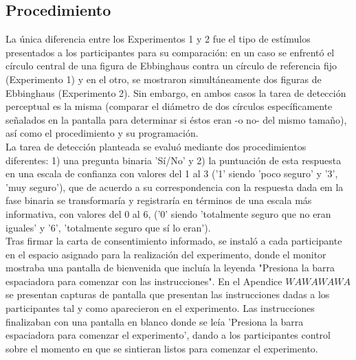 \begin{itemize}
\section{Procedimiento}

La única diferencia entre los Experimentos 1 y 2 fue el tipo de estímulos presentados a los participantes para su comparación: en un caso se enfrentó el círculo central de una figura de Ebbinghaus contra un círculo de referencia fijo (Experimento 1) y en el otro, se mostraron simultáneamente dos figuras de Ebbinghaus (Experimento 2). Sin embargo, en ambos casos la tarea de detección perceptual es la misma (comparar el diámetro de dos círculos específicamente señalados en la pantalla para determinar si éstos eran -o no- del mismo tamaño), así como el procedimiento y su programación.\\

La tarea de detección planteada se evaluó mediante dos procedimientos diferentes: 1) una pregunta binaria 'Sí/No' y 2) la puntuación de esta respuesta en una escala de confianza con valores del 1 al 3 ('1' siendo 'poco seguro' y '3', 'muy seguro'), que de acuerdo a su correspondencia con la respuesta dada em la fase binaria se transformaría y registraría en términos de una escala más informativa, con valores del 0 al 6, ('0' siendo 'totalmente seguro que no eran iguales' y '6', 'totalmente seguro que sí lo eran').\\

Tras firmar la carta de consentimiento informado, se instaló a cada participante en el espacio asignado para la realización del experimento, donde el monitor mostraba una pantalla de bienvenida que incluía la leyenda "Presiona la barra espaciadora para comenzar con las instrucciones". En el Apendice $WAWAWAWA$ se presentan capturas de pantalla que presentan las instrucciones dadas a los participantes tal y como aparecieron en el experimento. Las instrucciones finalizaban con una pantalla en blanco donde se leía 'Presiona la barra espaciadora para comenzar el experimento', dando a los participantes control sobre el momento en que se sintieran listos para comenzar el experimento.\\


\end{itemize}
